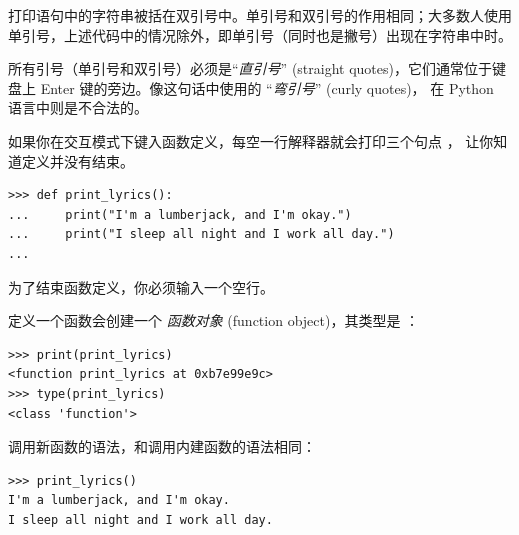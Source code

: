 打印语句中的字符串被括在双引号中。单引号和双引号的作用相同；大多数人使用单引号，上述代码中的情况除外，即单引号（同时也是撇号）出现在字符串中时。


所有引号（单引号和双引号）必须是``{\em 直引号}'' (straight quotes)，它们通常位于键盘上 Enter 键的旁边。像这句话中使用的 ``{\em 弯引号}'' (curly quotes)， 在 Python 语言中则是不合法的。


如果你在交互模式下键入函数定义，每空一行解释器就会打印三个句点 ，
让你知道定义并没有结束。

\begin{lstlisting}
>>> def print_lyrics():
...     print("I'm a lumberjack, and I'm okay.")
...     print("I sleep all night and I work all day.")
...
\end{lstlisting}

%

为了结束函数定义，你必须输入一个空行。


定义一个函数会创建一个 {\em 函数对象} (function object)，其类型是 ：
  
  

\begin{lstlisting}
>>> print(print_lyrics)
<function print_lyrics at 0xb7e99e9c>
>>> type(print_lyrics)
<class 'function'>
\end{lstlisting}

%

调用新函数的语法，和调用内建函数的语法相同：

\begin{lstlisting}
>>> print_lyrics()
I'm a lumberjack, and I'm okay.
I sleep all night and I work all day.
\end{lstlisting}

%


